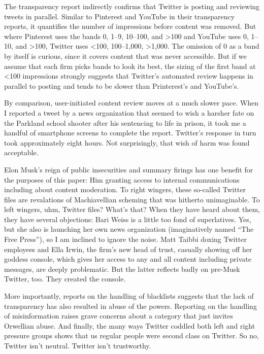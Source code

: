The transparency report indirectly confirms that Twitter is posting and
reviewing tweets in parallel. Similar to Pinterest and YouTube in their
transparency reports, it quantifies the number of impressions before content was
removed. But where Pinterest uses the bands 0, 1–9, 10–100, and >100 and YouTube
uses 0, 1–10, and >100, Twitter uses <100, 100–1,000, >1,000. The omission of 0
as a band by itself is curious, since it covers content that was never
accessible. But if we assume that each firm picks bands to look its best, the
sizing of the first band at <100 impressions strongly suggests that Twitter’s
automated review happens in parallel to posting and tends to be slower than
Printerest’s and YouTube’s.

By comparison, user-initiated content review moves at a much slower pace. When I
reported a tweet by a news organization that seemed to wish a harsher fate on
the Parkland school shooter after his sentencing to life in prison, it took me a
handful of smartphone screens to complete the report. Twitter’s response in turn
took approximately eight hours. Not surprisingly, that wish of harm was found
acceptable.

Elon Musk's reign of public insecurities and summary firings has one benefit for
the purposes of this paper: Him granting access to internal communications
including about content moderation. To right wingers, these so-called Twitter
files are revalations of Machiavellian scheming that was hitherto unimaginable.
To left wingers, uhm, Twitter files? What's that? When they have heard about
them, they have several objections: Bari Weiss is a little too fond of
superlatives. Yes, but she also is launching her own news organization
(imaginatively named ``The Free Press''), so I am inclined to ignore the noise.
Matt Taibbi doxing Twitter employees and Ella Irwin, the firm's new head of
trust, casually showing off her goddess console, which gives her access to any
and all content including private messages, are deeply problematic. But the
latter reflects badly on pre-Musk Twitter, too. They created the console.

More importantly, reports on the handling of blacklists suggests that the lack
of transparency has also resulted in abuse of the powers. Reporting on the
handling of misinformation raises grave concerns about a category that just
invites Orwellian abuse. And finally, the many ways Twitter coddled both left
and right pressure groups shows that us regular people were second class on
Twitter. So no, Twitter isn't neutral. Twitter isn't trustworthy.



